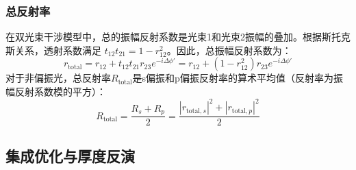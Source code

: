 \documentclass[withoutpreface,bwprint]{cumcmthesis} %
\begin{document}
\subsubsection{总反射率}
在双光束干涉模型中，总的振幅反射系数是光束1和光束2振幅的叠加。根据斯托克斯关系，透射系数满足 $t_{12}t_{21} = 1 - r_{12}^2$。因此，总振幅反射系数为：
\begin{equation}
r_{\text{total}} = r_{12} + t_{12}t_{21}r_{23} e^{-i\Delta\phi'} = r_{12} + (1-r_{12}^2)r_{23} e^{-i\Delta\phi'}
\end{equation}
对于非偏振光，总反射率$R_{\text{total}}$是s偏振和p偏振反射率的算术平均值（反射率为振幅反射系数模的平方）：
\begin{equation}
R_{\text{total}} = \frac{R_s + R_p}{2} = \frac{|r_{\text{total},s}|^2 + |r_{\text{total},p}|^2}{2}
\end{equation}

\subsection{集成优化与厚度反演}
\end{document}
